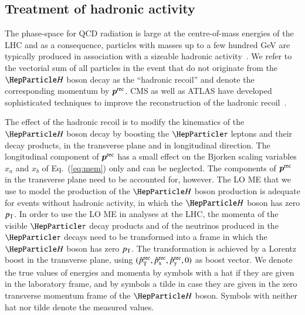 \subsection{Treatment of hadronic activity}
\label{sec:mem_hadRecoil}

The phase-space for QCD radiation is large at the centre-of-mass
energies of the LHC
and as a consequence, particles with masses up to a few hundred GeV 
are typically produced in association with a sizeable hadronic activity~\cite{Alwall:2010cq}.
We refer to the vectorial sum of all particles in the event that do not originate from the $\PHiggs$ boson decay
as the ``hadronic recoil'' and denote the corresponding momentum by $\bm{p}^{\textrm{rec}}$.
CMS as well as ATLAS have developed sophisticated techniques to improve the reconstruction 
of the hadronic recoil~\cite{CMS-JME-13-003,ATLAS-CONF-2014-019}.

The effect of the hadronic recoil is to modify the kinematics of the $\PHiggs$ boson decay
by boosting the $\Pgt$ leptons and their decay products,
in the transverse plane and in longitudinal direction.
The longitudinal component of $\bm{p}^{\textrm{rec}}$ has a small effect on 
the Bjorken scaling variables $x_{a}$ and $x_{b}$ of Eq.~(\ref{eq:mem}) only and can be neglected.
The components of $\bm{p}^{\textrm{rec}}$ in the transverse plane need to be accounted for, however.
The LO ME that we use to model the production of the $\PHiggs$ boson production 
is adequate for events without hadronic activity,
in which the $\PHiggs$ boson has zero $p_{\textrm{T}}$.
In order to use the LO ME in analyses at the LHC,
the momenta of the visible $\Pgt$ decay products and of the neutrinos produced in the $\Pgt$ decays
need to be transformed into a frame in which the $\PHiggs$ boson has zero $p_{\textrm{T}}$.
The transformation is achieved by a Lorentz boost in the transverse plane,
using $(\hat{p}_{\textrm{T}}^{\textrm{rec}}, \hat{p}_{\textrm{x}}^{\textrm{rec}}, \hat{p}_{\textrm{y}}^{\textrm{rec}}, 0)$ as boost
vector.
We denote the true values of energies and momenta by symbols with a
hat if they are given in the laboratory frame, and by symbols a tilde in case they are given in the zero transverse momentum frame of the $\PHiggs$ boson.
Symbols with neither hat nor tilde denote the measured values.


